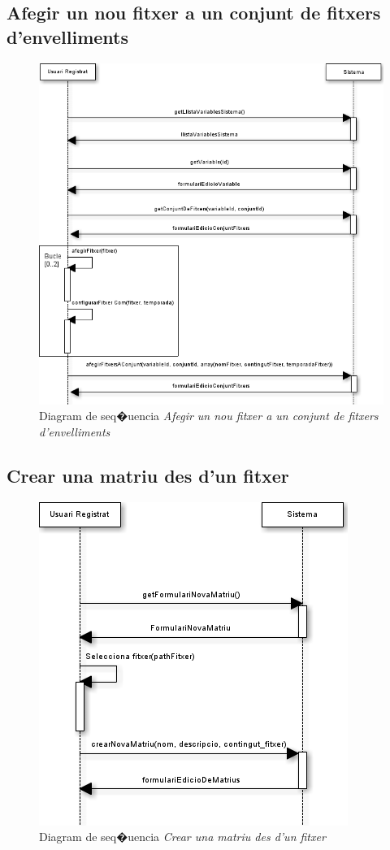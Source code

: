 \subsection*{Afegir un nou fitxer a un conjunt de fitxers d'envelliments}
\begin{figure}[H]
  \centering
  \includegraphics[scale=0.6]{img/specification/SequenceAddNewFilesToSeasonSet.png}
  \caption{Diagram de seq�{u}encia \textit{Afegir un nou fitxer a un conjunt de fitxers d'envelliments}}
  \label{fig:sequenceaddnewseason}
\end{figure}

\subsection*{Crear una matriu des d'un fitxer}
\begin{figure}[H]
  \centering
  \includegraphics[scale=0.6]{img/specification/SequenceCreateMatrix.png}
  \caption{Diagram de seq�{u}encia \textit{Crear una matriu des d'un fitxer}}
  \label{fig:sequencenewmatrixfromfile}
\end{figure}


